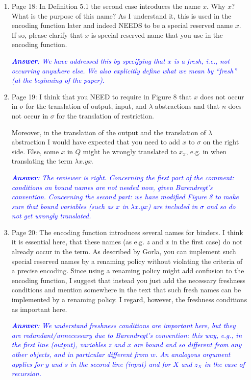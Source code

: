 \documentclass[11pt,a4paper]{article}
\newcommand{\answ}[1]{\smallskip \emph{\textcolor{blue}{\textbf{Answer}:  #1}}}
\newcommand{\checkthis}{}
\begin{document}
\begin{enumerate}
  \answ{Yes, we have adjusted this.}

\item  Page 18: In Definition 5.1 the second case introduces the name $x$. Why $x$? What
  is the purpose of this name? As I understand it, this is used in the encoding
  function later and indeed NEEDS to be a special reserved name $x$. If so, please
  clarify that $x$ is special reserved name that you use in the encoding function.
  
  \answ{We have addressed this by specifying that $x$ is a fresh, i.e., not occurring anywhere else. We also explicitly define what we mean by ``fresh'' (at the beginning of the paper).}
  
\item Page 19: I think that you NEED to require in Figure 8 that $x$ does not occur in
  $\sigma$ for the translation of output, input, and $\lambda$ abstractions and that
  $n$ does not occur in $\sigma$ for the translation of restriction. 
  
  Moreover, in
  the translation of the output and the translation of $\lambda$ abstraction I
  would have expected that you need to add $x$ to $\sigma$ on the right side. Else,
  some $x$ in $Q$ might be wrongly translated to $x_x$, e.g. in when translating the
  term $\lambda x. y x$.
  
  \answ{The reviewer is right. Concerning the first part of the comment: conditions on bound names are not needed now, given Barendregt's convention. Concerning the second part: we have modified Figure 8 to make sure that bound variables (such as $x$ in $\lambda x. y x$) are included in $\sigma$ and so do not get wrongly translated.} \checkthis
  
\item  Page 20: The encoding function introduces several names for binders. I think
  it is essential here, that these names (as e.g. $z$ and $x$ in the first case) do
  not already occur in the term. 
  As described by Gorla, you can implement such
  special reserved names by a renaming policy without violating the criteria of
  a precise encoding. Since using a renaming policy might add confusion to the
  encoding function, I suggest that instead you just add the necessary freshness
  conditions and mention somewhere in the text that such fresh names can be
  implemented by a renaming policy. I regard, however, the freshness conditions
  as important here. 
  
   \answ{We understand freshness conditions are important here, but they are redundant/unnecessary due to Barendregt's convention: this way, e.g., in the first line (output), variables $z$ and $x$ are bound and so different from any other objects, and in particular different from $w$. An analogous argument applies for $y$ and $s$ in the second line (input) and for $X$ and $z_X$ in the case of recursion.}
  

\end{enumerate}
\end{document}
